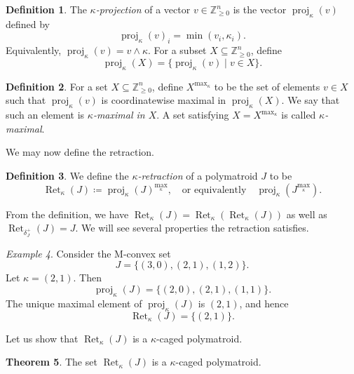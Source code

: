 \documentclass[11pt]{article}
\theoremstyle{definition}
\newtheorem{theorem}{Theorem}[section]
\newtheorem{definition}[theorem]{Definition}
\theoremstyle{remark}
\newtheorem{example}[theorem]{Example}
\newcommand{\Zgeqn}{\mathbb{Z}_{\geq 0}^n}     %
\newcommand{\delplus}{\delta_J^+}
\DeclareMathOperator{\proj}{proj}              %
\newcommand{\kproj}{\proj_{\kappa}}            %
\DeclareMathOperator{\Ret}{Ret}                %
\newcommand{\RetK}{\Ret_{\kappa}}              %
\newcommand{\Jmax}{J^{\max_{\kappa}}}
\begin{document}
\begin{definition}
    The \emph{$\kappa$-projection} of a vector $v\in\Zgeqn$ is the vector $\kproj(v)$ defined by
    \[
        \kproj(v)_i=\min(v_i,\kappa_i).
    \]
    Equivalently, $\kproj(v)=v\wedge\kappa$. For a subset $X\subseteq\Zgeqn$, define
    \[
        \kproj(X)=\{\kproj(v)\mid v\in X\}.
    \]
\end{definition}

\begin{definition}
    For a set $X\subseteq\Zgeqn$, define $X^{\max_\kappa}$ to be the set of elements $v\in X$ such that $\kproj(v)$ is coordinatewise maximal in $\kproj(X)$. We say that such an element is \emph{$\kappa$-maximal in $X$}. A set satisfying $X=X^{\max_\kappa}$ is called \emph{$\kappa$-maximal}.
\end{definition}
We may now define the retraction.
\begin{definition}
    We define the \emph{$\kappa$-retraction} of a polymatroid $J$ to be \[
    \RetK(J) \coloneqq \kproj(J)^{\max_\kappa}, \quad \text{or equivalently} \quad 
    \kproj(\Jmax).
    \]
\end{definition}
From the definition, we have $\RetK(J) = \RetK(\RetK(J))$ as well as $\Ret_{\delplus}(J) = J$. We will see several properties the retraction satisfies. 


\begin{example}
    Consider the M-convex set
    \[
        J = \{(3,0),(2,1),(1,2)\}.
    \]
    Let $\kappa=(2,1)$. Then
    \[
        \kproj(J)=\{(2,0),(2,1),(1,1)\}.
    \]
    The unique maximal element of $\kproj(J)$ is $(2,1)$, and hence
    \[
        \Ret_\kappa(J)=\{(2,1)\}.
    \]
\end{example}


Let us show that $\RetK(J)$ is a $\kappa$-caged polymatroid. 


\begin{theorem} \label{theorem:retraction_is_polymatroid}
    The set $\RetK(J)$ is a $\kappa$-caged polymatroid.
\end{theorem}
\end{document}

